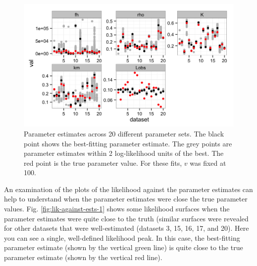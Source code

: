 \documentclass[12pt,reqno,final,pdftex]{amsart}\usepackage[]{graphicx}\usepackage[]{color}
\newenvironment{knitrout}{}{} %
\theoremstyle{plain}
\numberwithin{equation}{part}
\begin{document}
\begin{knitrout}\scriptsize
{}\color{fgcolor}\begin{figure}

\includegraphics[width=\linewidth]{figure/mult-datasets-fitting-1} \hfill{}

\caption[Parameter estimates across 20 different parameter sets]{Parameter estimates across 20 different parameter sets. The black point shows the best-fitting parameter estimate. The grey points are parameter estimates within 2 log-likelihood units of the best. The red point is the true parameter value. For these fits, $v$ was fixed at 100.}\label{fig:mult-datasets-fitting}
\end{figure}


\end{knitrout}

An examination of the plots of the likelihood against the parameter estimates can help to understand when the parameter estimates were close the true parameter values.
Fig. \ref{fig:lik-against-ests-1} shows some likelihood surfaces when the parameter estimates were quite close to the truth (similar surfaces were revealed for other datasets that were well-estimated (datasets 3, 15, 16, 17, and 20).
Here you can see a single, well-defined likelihood peak.
In this case, the best-fitting parameter estimate (shown by the vertical green line) is quite close to the true parameter estimate (shown by the vertical red line).
\end{document}
